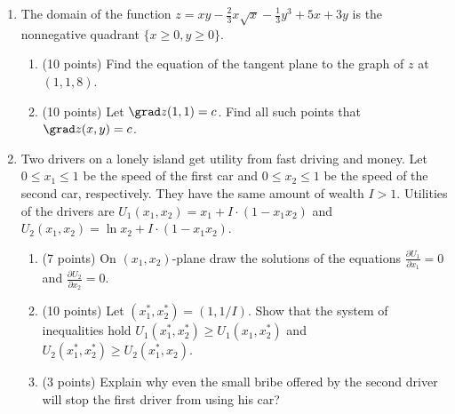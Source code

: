 \begin{enumerate}
\item The domain of the function $z = xy - \frac{2}{3}x\sqrt{x} - \frac{1}{3}y^3 +5x+3y$
is the nonnegative quadrant $\{x\geq 0, y \geq 0\}$.
\begin{enumerate}
  \item (10 points) Find the equation of the tangent plane to the graph of $z$ at $(1,1,8)$.
  \item  (10 points) Let $\grad z(1,1) = c$. Find all such points that $\grad z(x,y)=c$.
\end{enumerate}

\item Two drivers on a lonely island get utility from fast driving and money.
Let $0\leq x_1 \leq 1$ be the speed of the first car
and $0\leq x_2 \leq 1$ be the speed of the second car, respectively.
They have the same amount of wealth $I>1$. Utilities of the drivers are
$U_1(x_1, x_2) = x_1 + I\cdot (1 - x_1 x_2)$ and $U_2(x_1, x_2) = \ln x_2 + I\cdot (1 - x_1 x_2)$.
\begin{enumerate}
  \item (7 points) On $(x_1, x_2)$-plane draw the solutions of
  the equations $\frac{\partial U_1}{\partial x_1}=0$ and $\frac{\partial U_2}{\partial x_2}=0$.
  \item (10 points) Let $(x_1^*, x_2^*)=(1, 1/I)$.
  Show that the system of inequalities hold $U_1(x_1^*, x_2^*)\geq U_1(x_1, x_2^*)$
  and  $U_2(x_1^*, x_2^*)\geq U_2(x_1^*, x_2)$.
  \item (3 points) Explain why even the small bribe
  offered by the second driver will stop the first driver from using his car?
\end{enumerate}

\end{enumerate}
